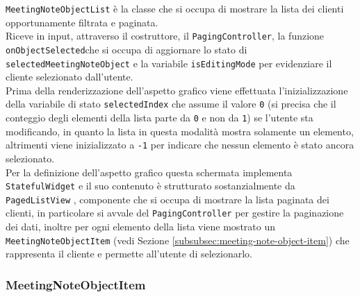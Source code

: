 \lstinline{MeetingNoteObjectList} è la classe che si occupa di mostrare la lista dei clienti opportunamente filtrata e paginata. \\
Riceve in input, attraverso il costruttore, il \lstinline{PagingController}, la funzione \lstinline{onObjectSelected}che si occupa di aggiornare lo stato di \lstinline{selectedMeetingNoteObject} e la variabile \lstinline{isEditingMode} per evidenziare il cliente selezionato dall'utente. \\
Prima della renderizzazione dell'aspetto grafico viene effettuata l'inizializzazione della variabile di stato \lstinline{selectedIndex} che assume il valore \lstinline{0} (si precisa che il conteggio degli elementi della lista parte da \lstinline{0} e non da \lstinline{1}) se l'utente sta modificando, in quanto la lista in questa modalità mostra solamente un elemento, altrimenti viene inizializzato a \lstinline{-1} per indicare che nessun elemento è stato ancora selezionato. \\
Per la definizione dell'aspetto grafico questa schermata implementa \lstinline{StatefulWidget} e il suo contenuto è strutturato sostanzialmente da \lstinline{PagedListView} \cite{site:infinite-scroll-pagination}, componente che si occupa di mostrare la lista paginata dei clienti, in particolare si avvale del \lstinline{PagingController} per gestire la paginazione dei dati, inoltre per ogni elemento della lista viene mostrato un \lstinline{MeetingNoteObjectItem} (vedi Sezione \ref{subsubsec:meeting-note-object-item}) che rappresenta il cliente e permette all'utente di selezionarlo.

\subsubsection*{MeetingNoteObjectItem}
\label{subsubsec:meeting-note-object-item}

